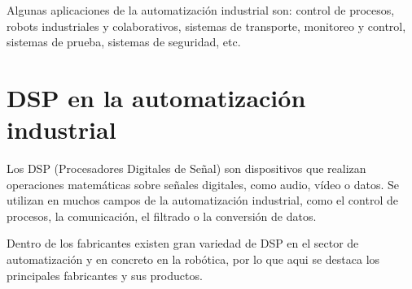\documentclass[11pt]{report}
\begin{document}
Algunas aplicaciones de la automatización industrial son: control de procesos, robots industriales y colaborativos,
sistemas de transporte, monitoreo y control, sistemas de prueba, sistemas de seguridad, etc.

\section{DSP en la automatización industrial}
Los DSP (Procesadores Digitales de Señal) son dispositivos que realizan operaciones matemáticas
sobre señales digitales, como audio, vídeo o datos. Se utilizan en muchos campos de la automatización
industrial, como el control de procesos, la comunicación, el filtrado o la conversión de datos.

Dentro de los fabricantes existen gran variedad de DSP en el sector de automatización y en concreto
en la robótica, por lo que aqui se destaca los principales fabricantes y sus productos.
\end{document}
